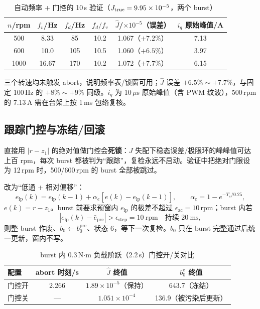 \documentclass[11pt,a4paper]{article}
\newcommand{\Jhat}{\hat J}
\begin{document}
\begin{table}[H]
\centering\footnotesize
\caption{自动频率 + 门控的 10\,s 验证（$J_{\rm true}=9.95\times10^{-5}$，两个 burst）}\label{tab:autofd}
\begin{tabular}{@{}cccccc@{}}
\toprule
$n$/rpm & $f_v$/Hz & $f_d$/Hz & $f_d/f_v$ & $\Jhat$/$\times10^{-5}$（误差） & $i_q$ 原始峰值/A\\
\midrule
500 & 8.33 & 85 & 10.2 & 1.067（$+7.2\%$） & 7.13\\
600 & 10.0 & 105 & 10.5 & 1.060（$+6.5\%$） & 3.97\\
1000 & 16.67 & 170 & 10.2 & 1.072（$+7.7\%$） & 6.15\\
\bottomrule
\end{tabular}
\end{table}

三个转速均未触发 abort，说明频率表/锁窗可用；$\Jhat$ 误差 $+6.5\%\sim+7.7\%$，与固定 100\,Hz 的 $+8\%\sim+9\%$ 同级。$i_q$ 为 10\,$\mu$s 原始峰值（含 PWM 纹波），500\,rpm 的 7.13\,A 需在台架上按 1\,ms 包络复核。

\subsection{跟踪门控与冻结/回滚}

直接用 $|r-z_1|$ 的绝对值做门控会\textbf{死锁}：$J$ 失配下稳态误差/极限环的峰峰值可达上百 rpm，每次 burst 都被判为“跟踪”，复检永远不启动。验证中把绝对门限设为 12\,rpm 时，500/600\,rpm 的 burst 全部被跳过。

改为“低通 + 相对偏移”：
\begin{equation}
e_{\mathrm{lp}}(k)=e_{\mathrm{lp}}(k-1)+\alpha_e\left[e(k)-e_{\mathrm{lp}}(k-1)\right],
\qquad \alpha_e=1-e^{-T_s/0.25},
\label{eq:lp}
\end{equation}
$e(k)=r-z_1$。burst 前要求预窗内 $e_{\mathrm{lp}}$ 的极差不超过 $\epsilon_{\mathrm{ac}}=10$\,rpm；burst 内若
\begin{equation}
\left|e_{\mathrm{lp}}(k)-\bar e_{\mathrm{pre}}\right|>\epsilon_{\mathrm{step}}=10\ \mathrm{rpm}
\quad\text{持续 }20\ \mathrm{ms},
\label{eq:gateburst}
\end{equation}
则整 burst 作废、$b_0\leftarrow b_0^{\mathrm{pre}}$、状态 6，等下一次复检。$b_0$ 只在 burst 完整通过后统一更新，窗内不写。

\begin{table}[H]
\centering\footnotesize
\caption{burst 内 0.3\,N$\cdot$m 负载阶跃（2.2\,s）门控开/关对比}\label{tab:gate}
\begin{tabular}{@{}lccc@{}}
\toprule
配置 & abort 时刻/s & $\Jhat$ 终值 & $b_0^{\mathrm e}$ 终值\\
\midrule
门控开 & 2.266 & $1.89\times10^{-5}$（保持） & 643.7（冻结）\\
门控关 & --- & $1.051\times10^{-4}$ & 136.9（被污染后更新）\\
\bottomrule
\end{tabular}
\end{table}
\end{document}
